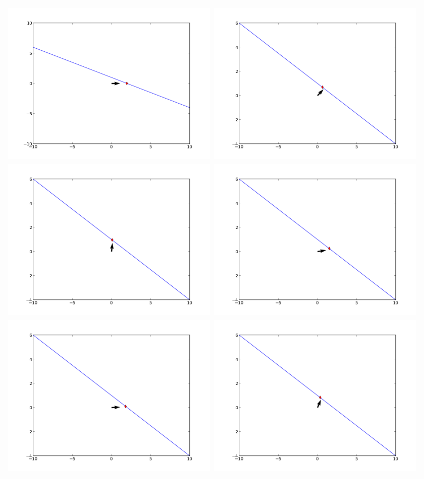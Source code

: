 \documentclass[12pt,fleqn]{article}\usepackage{../../common}
\begin{document}
\includegraphics[height=4cm]{1i3_0.png}
\includegraphics[height=4cm]{1i3_4.png}
\includegraphics[height=4cm]{1i3_8.png}
\includegraphics[height=4cm]{1i3_12.png}
\includegraphics[height=4cm]{1i3_16.png}
\includegraphics[height=4cm]{1i3_20.png}
\end{document}
